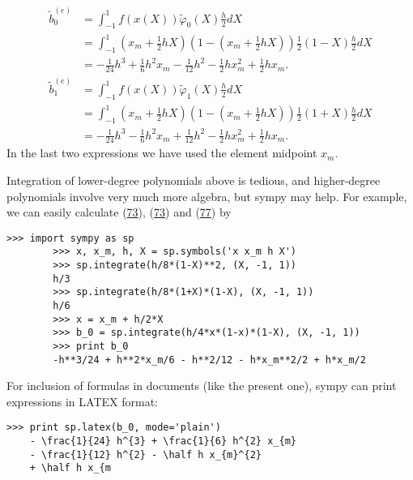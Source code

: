\documentclass[../main.tex]{subfiles}
\begin{document}
	\begin{equation}\label{eqa77}
		\begin{aligned}
			\tilde{b}_{0}^{(e)} &=\int_{-1}^{1} f(x(X)) \tilde{\varphi}_{0}(X) \frac{h}{2} d X \\
			&=\int_{-1}^{1}\left(x_{m}+\frac{1}{2} h X\right)\left(1-\left(x_{m}+\frac{1}{2} h X\right)\right) \frac{1}{2}(1-X) \frac{h}{2} d X \\
			&=-\frac{1}{24} h^{3}+\frac{1}{6} h^{2} x_{m}-\frac{1}{12} h^{2}-\frac{1}{2} h x_{m}^{2}+\frac{1}{2} h x_{m}.
		\end{aligned}
	\end{equation}
	\begin{equation}\label{eqa78}
		\begin{aligned}
			\tilde{b}_{1}^{(e)} &=\int_{-1}^{1} f(x(X)) \tilde{\varphi}_{1}(X) \frac{h}{2} d X \\
			&=\int_{-1}^{1}\left(x_{m}+\frac{1}{2} h X\right)\left(1-\left(x_{m}+\frac{1}{2} h X\right)\right) \frac{1}{2}(1+X) \frac{h}{2} d X \\
			&=-\frac{1}{24} h^{3}-\frac{1}{6} h^{2} x_{m}+\frac{1}{12} h^{2}-\frac{1}{2} h x_{m}^{2}+\frac{1}{2} h x_{m}.
		\end{aligned}
	\end{equation}
	In the last two expressions we have used the element midpoint $x_{m}$.
	
	Integration of lower-degree polynomials above is tedious, and higher-degree polynomials involve very much more algebra, but sympy may help. For example, we can easily calculate (\hyperref[eqa73]{73}), (\hyperref[eqa73]{73}) and (\hyperref[eqa77]{77}) by
	\begin{lstlisting}[numbers=none]
		>>> import sympy as sp
		>>> x, x_m, h, X = sp.symbols('x x_m h X')
		>>> sp.integrate(h/8*(1-X)**2, (X, -1, 1))
		h/3
		>>> sp.integrate(h/8*(1+X)*(1-X), (X, -1, 1))
		h/6
		>>> x = x_m + h/2*X
		>>> b_0 = sp.integrate(h/4*x*(1-x)*(1-X), (X, -1, 1))
		>>> print b_0
		-h**3/24 + h**2*x_m/6 - h**2/12 - h*x_m**2/2 + h*x_m/2	
	\end{lstlisting}
	For inclusion of formulas in documents (like the present one), sympy can print
	expressions in LATEX format:
	\begin{lstlisting}[numbers=none]
	>>> print sp.latex(b_0, mode='plain')
	- \frac{1}{24} h^{3} + \frac{1}{6} h^{2} x_{m}
	- \frac{1}{12} h^{2} - \half h x_{m}^{2}
	+ \half h x_{m
	\end{lstlisting}
\clearpage
\end{document}
